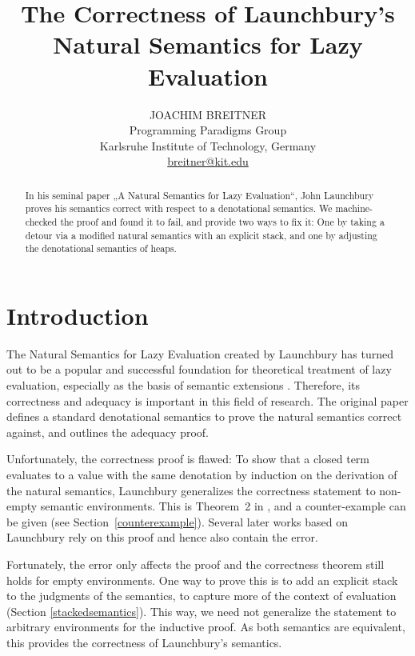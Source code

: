 \documentclass[twopage]{scrartcl}
\title%
      {The Correctness of Launchbury's Natural Semantics for Lazy Evaluation}
\author%
        {JOACHIM BREITNER\\ %
	Programming Paradigms Group\\
         Karlsruhe Institute of Technology, Germany\\
         \url{breitner@kit.edu}}
\theoremstyle{nonumberbreak}
\newcommand{\shortcite}{\cite}
\begin{document}
\label{firstpage}

\maketitle

\begin{abstract}
In his seminal paper „A Natural Semantics for Lazy Evaluation“, John Launchbury
proves his semantics correct with respect to a denotational semantics. We
machine-checked the proof and found it to fail, and provide two ways to fix it:
One by taking a detour via a modified natural semantics with an explicit stack,
and one by adjusting the denotational semantics of heaps.
\end{abstract}

\tableofcontents

\section{Introduction}

The Natural Semantics for Lazy Evaluation created by Launchbury \shortcite{launchbury} has turned out to be a popular and successful foundation for theoretical treatment of lazy evaluation, especially as the basis of semantic extensions \cite{nakata, nakata_blackhole, distributed, mixed, parallel}. Therefore, its correctness and adequacy is important in this field of research. The original paper defines a standard denotational semantics to prove the natural semantics correct against, and outlines the adequacy proof.

Unfortunately, the correctness proof is flawed: To show that a closed term evaluates to a value with the same denotation by induction on the derivation of the natural semantics, Launchbury generalizes the correctness statement to non-empty semantic environments. This is Theorem~2 in \cite{launchbury}, and a counter-example can be given (see Section~\ref{counterexample}). Several later works based on Launchbury rely on this proof and hence also contain the error.

Fortunately, the error only affects the proof and the correctness theorem still holds for empty environments. One way to prove this is to add an explicit stack to the judgments of the semantics, to capture more of the context of evaluation (Section \ref{stackedsemantics}). This way, we need not generalize the statement to arbitrary environments for the inductive proof. As both semantics are equivalent, this provides the correctness of Launchbury's semantics.
\end{document}
